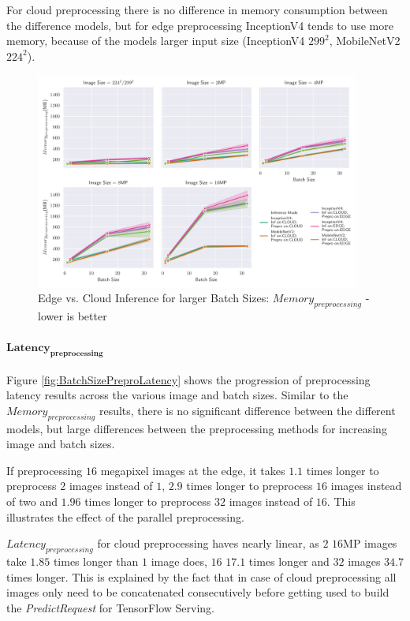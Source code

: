For cloud preprocessing there is no difference in memory consumption between the difference models, but for edge preprocessing InceptionV4 tends to use more memory, because of the models larger input size (InceptionV4 $299^2$, MobileNetV2 $224^2$).


\begin{figure}[!htb]
\centering
\includegraphics[width=0.95\textwidth]{./Bilder/single_plots/batch_size_plots/Effects_of_Batch_size_Preprocessing_Memory.pdf}
\caption{Edge vs. Cloud Inference for larger Batch Sizes:  $Memory_{preprocessing}$ - lower is better}
\label{fig:BatchSizePreproMemory}
\end{figure}

\paragraph{$\mathbf{Latency_{preprocessing}}$}
Figure \ref{fig:BatchSizePreproLatency} shows the progression of preprocessing latency results across the various image and batch sizes.
Similar to the $Memory_{preprocessing}$ results, there is no significant difference between the different models, but large differences between the preprocessing methods for increasing image and batch sizes.

If preprocessing $16$ megapixel images at the edge, it takes $1.1$ times longer to preprocess $2$ images instead of $1$, $2.9$ times longer to preprocess $16$ images instead of two and $1.96$ times longer to preprocess $32$ images instead of $16$.
This illustrates the effect of the parallel preprocessing.

$Latency_{preprocessing}$ for cloud preprocessing haves nearly linear, as $2$ $16$MP images take $1.85$ times longer than $1$ image does, $16$ $17.1$ times longer and $32$ images $34.7$ times longer.
This is explained by the fact that in case of cloud preprocessing all images only need to be concatenated consecutively before getting used to build the \emph{PredictRequest} for TensorFlow Serving. 


